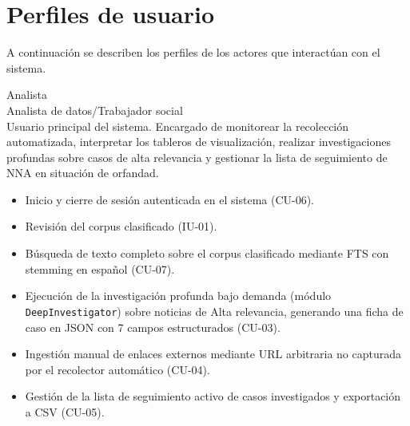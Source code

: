
\section{Perfiles de usuario}

A continuación se describen los perfiles de los actores que interactúan con el sistema.

\begin{Usuario}{Analista}{\\Analista de datos/Trabajador social\\} 
    \Uitem[Descripción:] Usuario principal del sistema. Encargado de monitorear la
    recolección automatizada, interpretar los tableros de visualización, realizar
    investigaciones profundas sobre casos de alta relevancia y gestionar la lista de
    seguimiento de NNA en situación de orfandad.
    \Uitem[Funciones:] 
        \begin{itemize}
            \item Inicio y cierre de sesión autenticada en el sistema (CU-06).
            \item Revisión del corpus clasificado (IU-01).
            \item Búsqueda de texto completo sobre el corpus clasificado mediante FTS
            con stemming en español (CU-07).
            \item Ejecución de la investigación profunda bajo demanda (módulo
            \texttt{DeepInvestigator}) sobre noticias de Alta relevancia, generando
            una ficha de caso en JSON con 7 campos estructurados (CU-03).
            \item Ingestión manual de enlaces externos mediante URL arbitraria no
            capturada por el recolector automático (CU-04).
            \item Gestión de la lista de seguimiento activo de casos investigados y
            exportación a CSV (CU-05).
        \end{itemize}
\end{Usuario}

